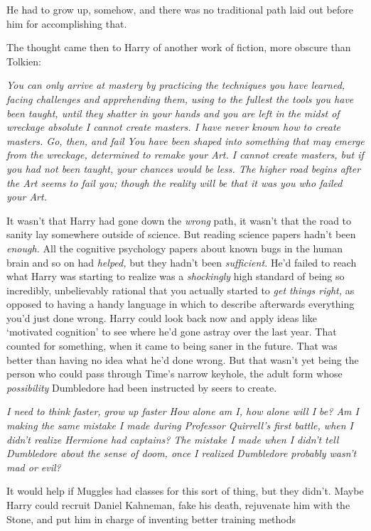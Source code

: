 He had to grow up, somehow, and there was no traditional path laid out before
him for accomplishing that.

The thought came then to Harry of another work of fiction, more obscure than
Tolkien:

\emph{You can only arrive at mastery by practicing the techniques you have
learned, facing challenges and apprehending them, using to the fullest the
tools you have been taught, until they shatter in your hands and you are left
in the midst of wreckage absolute{\el} I cannot create masters. I have never
known how to create masters. Go, then, and fail{\el} You have been shaped
into something that may emerge from the wreckage, determined to remake your
Art. I cannot create masters, but if you had not been taught, your chances
would be less. The higher road begins after the Art seems to fail you; though
the reality will be that it was you who failed your Art.}

It wasn't that Harry had gone down the \emph{wrong} path, it wasn't that the
road to sanity lay somewhere outside of science. But reading science papers
hadn't been \emph{enough.} All the cognitive psychology papers about known bugs
in the human brain and so on had \emph{helped,} but they hadn't been
\emph{sufficient.} He'd failed to reach what Harry was starting to realize was
a \emph{shockingly} high standard of being so incredibly, unbelievably rational
that you actually started to \emph{get things right,} as opposed to having a
handy language in which to describe afterwards everything you'd just done
wrong. Harry could look back now and apply ideas like `motivated cognition' to
see where he'd gone astray over the last year. That counted for something, when
it came to being saner in the future. That was better than having no idea what
he'd done wrong. But that wasn't yet being the person who could pass through
Time's narrow keyhole, the adult form whose \emph{possibility} Dumbledore had
been instructed by seers to create.

\emph{I need to think faster, grow up faster{\el} How alone am I, how alone
will I be? Am I making the same mistake I made during Professor Quirrell's
first battle, when I didn't realize Hermione had captains? The mistake I made
when I didn't tell Dumbledore about the sense of doom, once I realized
Dumbledore probably wasn't mad or evil?}

It would help if Muggles had classes for this sort of thing, but they didn't.
Maybe Harry could recruit Daniel Kahneman, fake his death, rejuvenate him with
the Stone, and put him in charge of inventing better training methods{\el}

